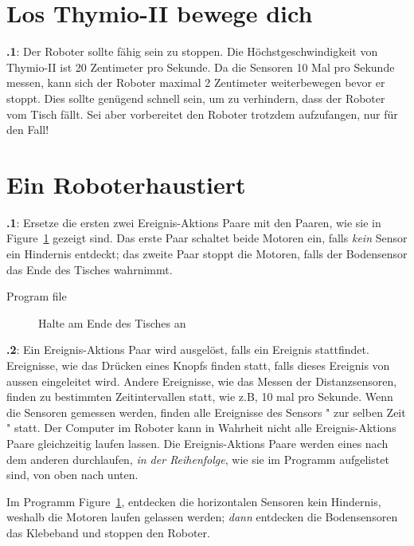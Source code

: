 \documentclass[12pt,a4paper,ngerman]{article}
\begin{document}
\section{Los Thymio-II bewege dich}

\textbf{\thesection.1}: 
Der Roboter sollte fähig sein zu stoppen. Die Höchstgeschwindigkeit von Thymio-II ist 20 Zentimeter pro Sekunde. Da die Sensoren 10 Mal pro Sekunde messen, kann sich der Roboter maximal 2 Zentimeter weiterbewegen bevor er stoppt. Dies sollte genügend schnell sein, um zu verhindern, dass der Roboter vom Tisch fällt. Sei aber vorbereitet den Roboter trotzdem aufzufangen, nur für den Fall!


\section{Ein Roboterhaustiert}

\textbf{\thesection.1}:
Ersetze die ersten zwei Ereignis-Aktions Paare mit den Paaren, wie sie in Figure~\ref{fig.answer1} gezeigt sind. Das erste Paar schaltet beide Motoren ein, falls \emph{kein} Sensor ein Hindernis entdeckt; das zweite Paar stoppt die Motoren, falls der Bodensensor das Ende des Tisches wahrnimmt.

{\raggedleft \hfill Program file }

\begin{figure}[hbt]
\begin{center}
\caption{Halte am Ende des Tisches an}\label{fig.answer1}
\end{center}
\end{figure}

\textbf{\thesection.2}:
Ein Ereignis-Aktions Paar wird ausgelöst, falls ein Ereignis stattfindet. Ereignisse, wie das Drücken eines Knopfs finden statt, falls dieses Ereignis von aussen eingeleitet wird. Andere Ereignisse, wie das Messen der Distanzsensoren, finden zu bestimmten Zeitintervallen statt, wie z.B, 10 mal pro Sekunde. Wenn die Sensoren gemessen werden, finden alle Ereignisse des Sensors " zur selben Zeit " statt. Der Computer im Roboter kann in Wahrheit nicht alle Ereignis-Aktions Paare gleichzeitig laufen lassen. Die Ereignis-Aktions Paare werden eines nach dem anderen durchlaufen, \emph{in der Reihenfolge}, wie sie im Programm aufgelistet sind, von oben nach unten.

Im Programm Figure~\ref{fig.answer1}, entdecken die horizontalen Sensoren kein Hindernis, weshalb die Motoren laufen gelassen werden; \emph{dann} entdecken die Bodensensoren das Klebeband und stoppen den Roboter.
\end{document}
